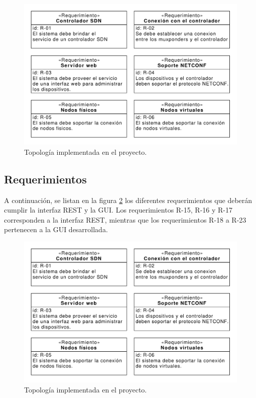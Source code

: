   \begin{figure}[H]
    \centering
    \includegraphics[scale=0.35]{Figures/req_sys.pdf}
    \caption{Topología implementada en el proyecto.}
    \label{fig:ubicacionapp}
  \end{figure}

  \subsection{Requerimientos}

  A continuación, se listan en la figura \ref{fig:req_app} los diferentes requerimientos que deberán cumplir la interfaz REST y la GUI. Los requerimientos R-15, R-16 y R-17 corresponden a la interfaz REST, mientras que los requerimientos R-18 a R-23 pertenecen a la GUI desarrollada.  

  \begin{figure}[H]
    \centering
    \includegraphics[scale=0.65]{Figures/req_sys.pdf}
    \caption{Topología implementada en el proyecto.}
    \label{fig:req_app}
  \end{figure}



